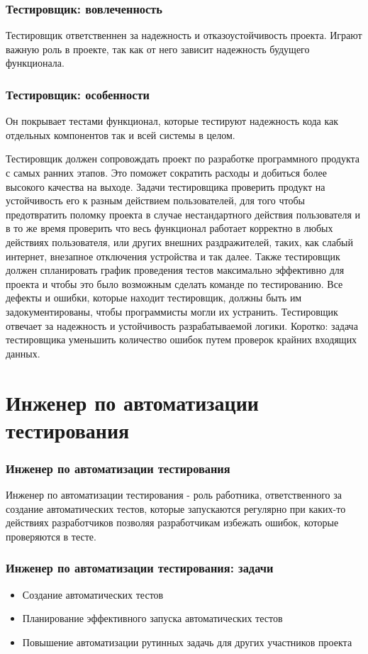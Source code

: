 \documentclass{../industrial-development}
\begin{document}
	\begin{frame} \frametitle{Тестировщик: вовлеченность}
		Тестировщик ответственнен за надежность и отказоустойчивость проекта. Играют важную роль в проекте, так как от него зависит надежность будущего функционала.
	\end{frame}
	
	\begin{frame} \frametitle{Тестировщик: особенности}
		Он покрывает тестами функционал, которые тестируют надежность кода как отдельных компонентов так и всей системы в целом. 
	\end{frame}
	
	\lecturenotes
		Тестировщик должен сопровождать проект по разработке программного продукта с самых ранних этапов. Это поможет сократить расходы и добиться более высокого качества на выходе. Задачи тестировщика проверить продукт на устойчивость его к разным действием пользователей, для того чтобы предотвратить поломку проекта в случае нестандартного действия пользователя и в то же время проверить что весь функционал работает корректно в любых действиях пользователя, или других внешних раздражителей, таких, как слабый интернет, внезапное отключения устройства и так далее. Также тестировщик должен спланировать график проведения тестов максимально эффективно для проекта и чтобы это было возможным сделать команде по тестированию. Все дефекты и ошибки, которые находит тестировщик, должны быть им задокументированы, чтобы программисты могли их устранить. Тестировщик отвечает за надежность и устойчивость разрабатываемой логики. Коротко: задача тестировщика уменьшить количество ошибок путем проверок крайних входящих данных.
	
	\section{Инженер по автоматизации тестирования}
	
	\begin{frame} \frametitle{Инженер по автоматизации тестирования}
		\begin{block}{}
			\alert {Инженер по автоматизации тестирования} - роль работника, ответственного за создание автоматических тестов, которые запускаются регулярно при каких-то действиях разработчиков позволяя разработчикам избежать ошибок, которые проверяются в тесте.
		\end{block}
		
	\end{frame}
	
	\begin{frame} \frametitle{Инженер по автоматизации тестирования: задачи}
		\begin{itemize}
			\item Создание автоматических тестов
			\item Планирование эффективного запуска автоматических тестов
			\item Повышение автоматизации рутинных задачь для других участников проекта		
		\end{itemize}
	\end{frame}
	
\end{document}
